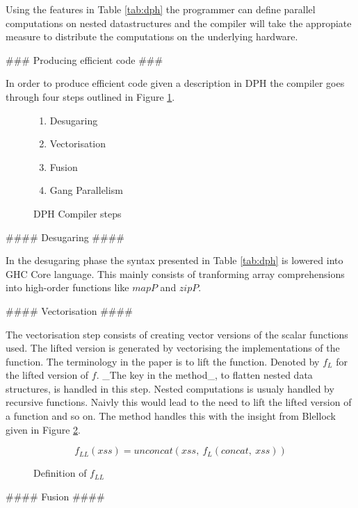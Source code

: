 \begin{multicols}{2}
\begin{markdown}

Using the features in Table \ref{tab:dph} the programmer can define
parallel computations on nested datastructures and the compiler will
take the appropiate measure to distribute the computations on the
underlying hardware.

### Producing efficient code ###

In order to produce efficient code given a description in DPH the
compiler goes through four steps outlined in Figure \ref{tab:dph-steps}.

\begin{figure}[H]
  \begin{enumerate}
    \item Desugaring
    \item Vectorisation
    \item Fusion
    \item Gang Parallelism
  \end{enumerate}
  \caption{DPH Compiler steps}
  \label{tab:dph-steps}
\end{figure}

#### Desugaring ####

In the desugaring phase the syntax presented in Table \ref{tab:dph} is
lowered into GHC Core language. This mainly consists of tranforming
array comprehensions into high-order functions like $mapP$ and $zipP$.

#### Vectorisation ####

The vectorisation step consists of creating vector versions of the
scalar functions used. The lifted version is generated by vectorising
the implementations of the function. The terminology in the paper is
to lift the function. Denoted by $f_L$ for the lifted version of
$f$. _The key in the method_, to flatten nested data structures, is
handled in this step. Nested computations is usualy handled by
recursive functions. Naivly this would lead to the need to lift the
lifted version of a function and so on. The method handles this with
the insight from Blellock \cite{nesl} given in Figure \ref{fig:lift2}.

\end{markdown}
\begin{figure}[H]
  $$ f_{LL}(xss) = unconcat(xss,\ f_L(concat,\ xss)) $$
  \caption{Definition of $f_{LL}$}
  \label{fig:lift2}
\end{figure}

\begin{markdown}
#### Fusion ####


\end{markdown}
\end{multicols}
